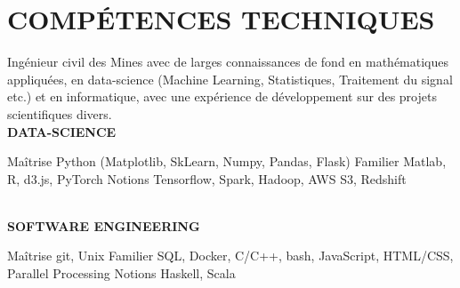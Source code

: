 \documentclass[]{cv-style}
\begin{document}
\section{COMPÉTENCES TECHNIQUES}
\vspace{-0.3cm}
%
Ingénieur civil des Mines avec de larges connaissances de fond en mathématiques 
appliquées, en data-science (Machine Learning, Statistiques, Traitement du
signal etc.) et en informatique, avec une expérience de développement sur des
projets scientifiques divers. \\[0.1cm]
\textbf{DATA-SCIENCE} \\[0.1cm]
\begin{entrylist}
%
\entry
{Maîtrise}
{{\normalfont Python (Matplotlib, SkLearn, Numpy, Pandas, Flask)}}
{}{\vspace{-0.5cm}}
%
\entry
{Familier}
{{\normalfont Matlab, R, d3.js, PyTorch}}
{}{\vspace{-0.5cm}}
%
\entry
{Notions}
{{\normalfont Tensorflow, Spark, Hadoop, AWS S3, Redshift}}{}{}
%
\end{entrylist}
\vspace{-0.5cm}\\
\textbf{SOFTWARE ENGINEERING} \\[0.1cm]
\begin{entrylist}
%
\entry
{Maîtrise}
{{\normalfont git, Unix}}
{}{\vspace{-0.5cm}}
%
\entry
{Familier}
{{\normalfont SQL, Docker, C/C++, bash, JavaScript, HTML/CSS, Parallel 
Processing}}
{}{\vspace{-0.5cm}}
%
\entry
{Notions}
{{\normalfont Haskell, Scala}}{}{\vspace{-0.5cm}}
%
\end{entrylist}
\end{document}
